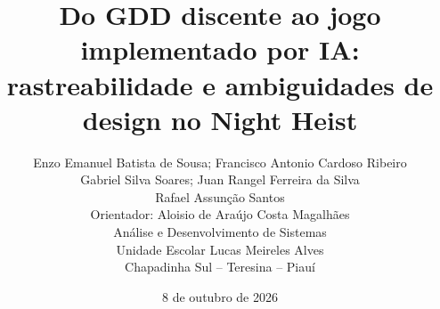 \title{Do GDD discente ao jogo implementado por IA:\\rastreabilidade e ambiguidades de design no Night Heist}
\author{\small Enzo Emanuel Batista de Sousa; Francisco Antonio Cardoso Ribeiro\\
\small Gabriel Silva Soares; Juan Rangel Ferreira da Silva\\
\small Rafael Assunção Santos\\[0.5em]
\small Orientador: Aloisio de Araújo Costa Magalhães\\
\small Análise e Desenvolvimento de Sistemas\\
\small Unidade Escolar Lucas Meireles Alves\\
\small Chapadinha Sul -- Teresina -- Piauí}
\date{8 de outubro de 2026}

